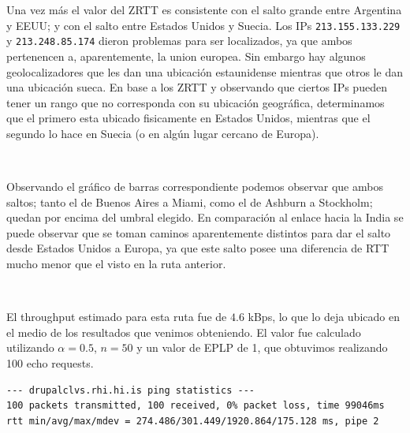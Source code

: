 \vspace{20pt}

Una vez más el valor del ZRTT es consistente con el salto grande entre Argentina y EEUU; y con el salto entre Estados Unidos y Suecia. Los IPs \verb|213.155.133.229| y \verb|213.248.85.174| dieron problemas para ser localizados, ya que ambos pertenencen a, aparentemente, la union europea. Sin embargo hay algunos geolocalizadores que les dan una ubicación estaunidense mientras que otros le dan una ubicación sueca. En base a los ZRTT y observando que ciertos IPs pueden tener un rango que no corresponda con su ubicación geográfica, determinamos que el primero esta ubicado fisicamente en Estados Unidos, mientras que el segundo lo hace en Suecia (o en algún lugar cercano de Europa).

~

Observando el gráfico de barras correspondiente podemos observar que ambos saltos; tanto el de Buenos Aires a Miami, como el de Ashburn a Stockholm; quedan por encima del umbral elegido. En comparación al enlace hacia la India se puede observar que se toman caminos aparentemente distintos para dar el salto desde Estados Unidos a Europa, ya que este salto posee una diferencia de RTT mucho menor que el visto en la ruta anterior.

~

El throughput estimado para esta ruta fue de $4.6$ kBps, lo que lo deja ubicado en el medio de los resultados que venimos obteniendo. El valor fue calculado utilizando $\alpha = 0.5$, $n = 50$ y un valor de EPLP de 1, que obtuvimos realizando 100 echo requests.

\begin{verbatim}
--- drupalclvs.rhi.hi.is ping statistics ---
100 packets transmitted, 100 received, 0% packet loss, time 99046ms
rtt min/avg/max/mdev = 274.486/301.449/1920.864/175.128 ms, pipe 2
\end{verbatim}

